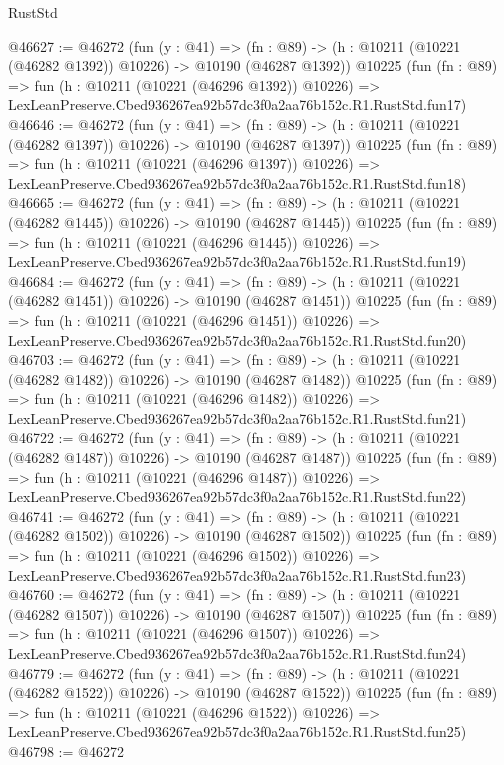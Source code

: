 \begin{lexlean}{RustStd}
\begin{coremodule}
@46627 := @46272
    (fun (y : @41) =>
    (fn : @89) -> (h : @10211 (@10221 (@46282 @1392)) @10226) -> @10190 (@46287 @1392))
    @10225
    (fun (fn : @89) =>
    fun (h : @10211 (@10221 (@46296 @1392)) @10226) =>
    LexLeanPreserve.Cbed936267ea92b57dc3f0a2aa76b152c.R1.RustStd.fun17)
@46646 := @46272
    (fun (y : @41) =>
    (fn : @89) -> (h : @10211 (@10221 (@46282 @1397)) @10226) -> @10190 (@46287 @1397))
    @10225
    (fun (fn : @89) =>
    fun (h : @10211 (@10221 (@46296 @1397)) @10226) =>
    LexLeanPreserve.Cbed936267ea92b57dc3f0a2aa76b152c.R1.RustStd.fun18)
@46665 := @46272
    (fun (y : @41) =>
    (fn : @89) -> (h : @10211 (@10221 (@46282 @1445)) @10226) -> @10190 (@46287 @1445))
    @10225
    (fun (fn : @89) =>
    fun (h : @10211 (@10221 (@46296 @1445)) @10226) =>
    LexLeanPreserve.Cbed936267ea92b57dc3f0a2aa76b152c.R1.RustStd.fun19)
@46684 := @46272
    (fun (y : @41) =>
    (fn : @89) -> (h : @10211 (@10221 (@46282 @1451)) @10226) -> @10190 (@46287 @1451))
    @10225
    (fun (fn : @89) =>
    fun (h : @10211 (@10221 (@46296 @1451)) @10226) =>
    LexLeanPreserve.Cbed936267ea92b57dc3f0a2aa76b152c.R1.RustStd.fun20)
@46703 := @46272
    (fun (y : @41) =>
    (fn : @89) -> (h : @10211 (@10221 (@46282 @1482)) @10226) -> @10190 (@46287 @1482))
    @10225
    (fun (fn : @89) =>
    fun (h : @10211 (@10221 (@46296 @1482)) @10226) =>
    LexLeanPreserve.Cbed936267ea92b57dc3f0a2aa76b152c.R1.RustStd.fun21)
@46722 := @46272
    (fun (y : @41) =>
    (fn : @89) -> (h : @10211 (@10221 (@46282 @1487)) @10226) -> @10190 (@46287 @1487))
    @10225
    (fun (fn : @89) =>
    fun (h : @10211 (@10221 (@46296 @1487)) @10226) =>
    LexLeanPreserve.Cbed936267ea92b57dc3f0a2aa76b152c.R1.RustStd.fun22)
@46741 := @46272
    (fun (y : @41) =>
    (fn : @89) -> (h : @10211 (@10221 (@46282 @1502)) @10226) -> @10190 (@46287 @1502))
    @10225
    (fun (fn : @89) =>
    fun (h : @10211 (@10221 (@46296 @1502)) @10226) =>
    LexLeanPreserve.Cbed936267ea92b57dc3f0a2aa76b152c.R1.RustStd.fun23)
@46760 := @46272
    (fun (y : @41) =>
    (fn : @89) -> (h : @10211 (@10221 (@46282 @1507)) @10226) -> @10190 (@46287 @1507))
    @10225
    (fun (fn : @89) =>
    fun (h : @10211 (@10221 (@46296 @1507)) @10226) =>
    LexLeanPreserve.Cbed936267ea92b57dc3f0a2aa76b152c.R1.RustStd.fun24)
@46779 := @46272
    (fun (y : @41) =>
    (fn : @89) -> (h : @10211 (@10221 (@46282 @1522)) @10226) -> @10190 (@46287 @1522))
    @10225
    (fun (fn : @89) =>
    fun (h : @10211 (@10221 (@46296 @1522)) @10226) =>
    LexLeanPreserve.Cbed936267ea92b57dc3f0a2aa76b152c.R1.RustStd.fun25)
@46798 := @46272

\end{coremodule}
\end{lexlean}
